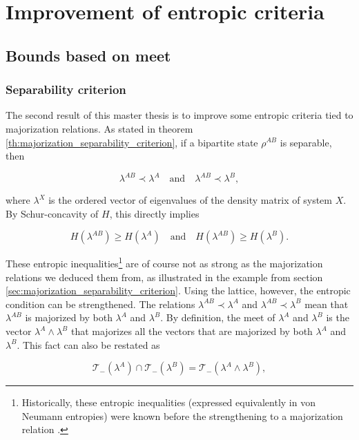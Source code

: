 \chapter{Improvement of entropic criteria} \label{chap:criteria}

\section{Bounds based on meet}

\subsection{Separability criterion}

The second result of this master thesis is to improve some entropic criteria tied to majorization relations. As stated in theorem \ref{th:majorization_separability_criterion}, if a bipartite state $\rho^{AB}$ is separable, then

\begin{equation}
    \lambda^{AB} \prec \lambda^A \quad \text{and} \quad \lambda^{AB} \prec \lambda^{B},
\end{equation}

where $\lambda^X$ is the ordered vector of eigenvalues of the density matrix of system $X$. By Schur-concavity of $H$, this directly implies

\begin{equation}
    H(\lambda^{AB}) \geq H(\lambda^A) \quad \text{and} \quad H(\lambda^{AB}) \geq H(\lambda^B).
\end{equation}

These entropic inequalities\footnote{Historically, these entropic inequalities (expressed equivalently in von Neumann entropies) were known before the strengthening to a majorization relation \cite{cerf_negative_1997, nielsen_separable_2001}.} are of course not as strong as the majorization relations we deduced them from, as illustrated in the example from section \ref{sec:majorization_separability_criterion}. Using the lattice, however, the entropic condition can be strengthened. The relations $\lambda^{AB} \prec \lambda^A$ and $\lambda^{AB} \prec \lambda^{B}$ mean that $\lambda^{AB}$ is majorized by both $\lambda^A$ and $\lambda^B$. By definition, the meet of $\lambda^A$ and $\lambda^B$ is the vector $\lambda^A \wedge \lambda^B$ that majorizes all the vectors that are majorized by both $\lambda^A$ and $\lambda^B$. This fact can also be restated as 

\begin{equation}
    \mathcal{T}_-(\lambda^A) \cap \mathcal{T}_-(\lambda^B) = \mathcal{T}_-(\lambda^A \wedge \lambda^B),
\end{equation}

